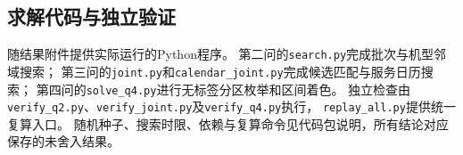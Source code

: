 \documentclass[bwprint]{gmcmthesis}
\begin{document}

\cite{mittelbach_latex_2004,wright_latex3_2009,beeton_unicode_2008,vieth_experiences_2009}





\clearpage
\begin{appendices}
\section{求解代码与独立验证}
随结果附件提供实际运行的Python程序。
第二问的\texttt{search.py}完成批次与机型邻域搜索；
第三问的\texttt{joint.py}和\texttt{calendar\_joint.py}完成候选匹配与服务日历搜索；
第四问的\texttt{solve\_q4.py}进行无标签分区枚举和区间着色。
独立检查由\texttt{verify\_q2.py}、\texttt{verify\_joint.py}及\texttt{verify\_q4.py}执行，
\texttt{replay\_all.py}提供统一复算入口。
随机种子、搜索时限、依赖与复算命令见代码包说明，所有结论对应保存的未舍入结果。

\end{appendices}
\end{document}
